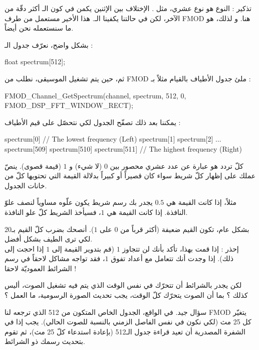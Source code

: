 \begin{information}
تذكير : النوع
هو نوع عشري، مثل
.
الإختلاف بين الإثنين يكمن في كون الـ
أكثر دقّة من الآخر، لكن في حالتنا يكفينا الـ.
هذا الأخير مستعمل من طرف
\textenglish{FMOD}
هنا. و لذلك، هو ما سنستعمله نحن أيضاً.
\end{information}

بشكل واضح، نعرّف جدول الـ :

\begin{Csource}
float spectrum[512];
\end{Csource}

ثم، حين يتم تشغيل الموسيقى، نطلب من 
\textenglish{FMOD}
ملئ جدول الأطياف بالقيام مثلاً بـ :

\begin{Csource}
FMOD_Channel_GetSpectrum(channel, spectrum, 512, 0, FMOD_DSP_FFT_WINDOW_RECT);
\end{Csource}

يمكننا بعد ذلك تصفّح الجدول لكي نتحصّل على قيم الأطياف :

\begin{Csource}
spectrum[0] // The lowest frequency (Left)
spectrum[1]
spectrum[2]
...
spectrum[509]
spectrum[510]
spectrum[511] // The highest frequency (Right)
\end{Csource}

كلّ تردد هو عبارة عن عدد عشري محصور بين $ 0 $ (لا شيء) و $ 1 $ (قيمة قصوى). ينصّ عملك على إظهار كلّ شريط سواء كان قصيراً أو كبيراً بدلالة القيمة التي تحتويها كلّ من خانات الجدول.

مثلاً، إذا كانت القيمة هي $ 0.5 $ يجدر بك رسم شريط يكون علّوه مساوياً لنصف علوّ النافذة. إذا كانت القيمة هي $ 1 $، فسيأخذ الشريط كلّ علو النافذة.

بشكل عام، تكون القيم ضعيفة (أكثر قرباً من $ 0 $ على $ 1 $). أنصحك بضرب كلّ القيم بـ20 لكي ترى الطيف بشكل أفضل.\\
إحذر : إذا قمت بهذا، تأكد بأنك لن تتجاوز $ 1 $ (قم بتدوير القيمة إلى $ 1 $ إذا احجت إلى ذلك). إذا وجدت أنك تتعامل مع أعداد تفوق $ 1 $، فقد تواجه مشاكل لاحقاً في رسم الشرائط العموديّة لاحقا !

\begin{question}
لكن يجدر بالشرائط أن تتحرّك في نفس الوقت الذي يتم فيه تشغيل الصوت، أليس كذلك ؟ بما أن الصوت يتحرّك كلّ الوقت، يجب تحديث الصورة الرسومية، ما العمل ؟
\end{question}

سؤال جيد. في الواقع، الجدول الخاص المتكون من 
512 
الذي ترجعه لنا
\textenglish{FMOD}
يتغيّر كل 25 مث (لكي نكون في نفس الفاصل الزمني بالنسبة للصوت الحالي). يجب إذا في الشفرة المصدرية أن تعيد قراءة جدول الـ512
 (بإعادة استدعاء
 كلّ 25 مث)، ثم تقوم بتحديث رسمك ذو الشرائط.
 
